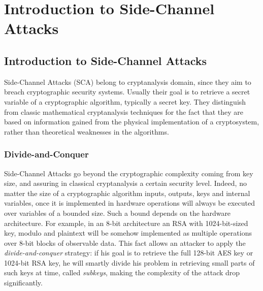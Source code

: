 \chapter{Introduction to Side-Channel Attacks} %

\label{ChapterIntroductionSCA}


\section{Introduction to Side-Channel Attacks}

Side-Channel Attacks (SCA) belong to cryptanalysis domain,  since they aim to breach cryptographic security systems. Usually their goal is to retrieve a secret variable of a cryptographic algorithm, typically a secret key. They distinguish from classic mathematical cryptanalysis techniques for the fact that they are based on information gained from the physical implementation of a cryptosystem, rather than theoretical weaknesses in the algorithms.  

\subsection{Divide-and-Conquer}
Side-Channel Attacks go beyond the cryptographic complexity coming from key size, and assuring in classical cryptanalysis a certain security level. Indeed, no matter the size of a cryptographic algorithm inputs, outputs, keys and internal variables, once it is implemented in hardware operations will always be executed over variables of a bounded size. Such a bound depends on the hardware architecture. For example, in an 8-bit architecture an RSA with 1024-bit-sized key, modulo and plaintext will be somehow implemented as multiple operations over 8-bit blocks of observable data. This fact allows an attacker to apply the \emph{divide-and-conquer} strategy: if his goal is to retrieve the full 128-bit AES key or 1024-bit RSA key, he will smartly divide his problem in retrieving small parts of such keys at time, called \emph{subkeys}, making the complexity of the attack drop significantly. 

